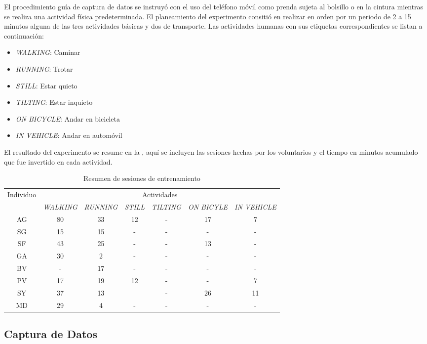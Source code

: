El procedimiento guía de captura de datos se instruyó con el uso del
teléfono móvil como prenda sujeta al bolsillo o en la cintura mientras
se realiza una actividad física predeterminada. El planeamiento del
experimento consitió en realizar en orden por un periodo de 2 a 15
minutos alguna de las tres actividades básicas y dos de transporte.
Las actividades humanas con sus etiquetas correspondientes se listan
a continuación:
\begin{itemize}
\item \emph{WALKING}: Caminar
\item \emph{RUNNING}: Trotar
\item \emph{STILL}: Estar quieto
\item \emph{TILTING}: Estar inquieto
\item \emph{ON BICYCLE}: Andar en bicicleta
\item \emph{IN VEHICLE}: Andar en automóvil
\end{itemize}
El resultado del experimento se resume en la ,
aquí se incluyen las sesiones hechas por los voluntarios y el tiempo
en minutos acumulado que fue invertido en cada actividad. 

\begin{table}[h]
\begin{centering}
\begin{tabular}{|c|c|c|c|c|c|c|}
\hline 
\multirow{2}{*}{Individuo} & \multicolumn{6}{c|}{Actividades}\tabularnewline
\cline{2-7} 
 & \emph{\footnotesize{}WALKING} & \emph{\footnotesize{}RUNNING} & \emph{\footnotesize{}STILL} & \emph{\footnotesize{}TILTING} & \emph{\footnotesize{}ON BICYLE} & \emph{\footnotesize{}IN VEHICLE}\tabularnewline
\hline 
\hline 
AG & 80 & 33 & 12 & - & 17 & 7\tabularnewline
\hline 
SG & 15 & 15 & - & - & - & -\tabularnewline
\hline 
SF & 43 & 25 & - & - & 13 & -\tabularnewline
\hline 
GA & 30 & 2 & - & - & - & -\tabularnewline
\hline 
BV & - & 17 & - & - & - & -\tabularnewline
\hline 
PV & 17 & 19 & 12 & - & - & 7\tabularnewline
\hline 
SY & 37 & 13 &  & - & 26 & 11\tabularnewline
\hline 
MD & 29 & 4 & - & - & - & -\tabularnewline
\hline 
\end{tabular}
\par\end{centering}
\caption{\label{tab6:sesiones}Resumen de sesiones de entrenamiento}
\end{table}


\subsection{Captura de Datos}

